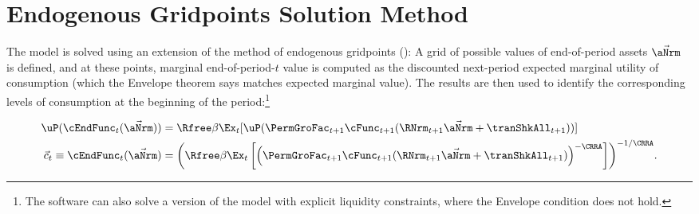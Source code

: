 \documentclass[\econtexRoot/BufferStockTheory]{subfiles}
\begin{document}
\section{Endogenous Gridpoints Solution Method}\label{sec:ApndxSolnMethEndogGpts}

The model is solved using an extension of the method of endogenous gridpoints (\cite{carrollEGM}): A grid of possible values of end-of-period assets $\vec{\aNrm}$ is defined, and at these points, marginal end-of-period-$t$ value is computed as the discounted next-period expected marginal utility of consumption (which the Envelope theorem says matches expected marginal value).  The results are then used to identify the corresponding levels of consumption at the beginning of the period:\footnote{The software can also solve a version of the model with explicit liquidity constraints, where the Envelope condition does not hold.}

\begin{equation}\begin{gathered}\begin{aligned}
  \uP(\cEndFunc_{t}(\vec{\aNrm}))  & = \Rfree \beta \Ex_{t}[ \uP(\PermGroFac_{t+1}
  \cFunc_{t+1}(\RNrm_{t+1}\vec{\aNrm} + \tranShkAll_{t+1}))] \label{eq:cEulerEndog}
\\ \vec{c}_{t} \equiv \cEndFunc_{t}(\vec{\aNrm})  & = {\left(\Rfree \beta \Ex_{t}\left[ {\left(\PermGroFac_{t+1}
      \cFunc_{t+1}(\RNrm_{t+1}\vec{\aNrm} +
      \tranShkAll_{t+1})\right)}^{-\CRRA}\right]\right)}^{-1/\CRRA}. \notag
\end{aligned}\end{gathered}\end{equation}
\end{document}
